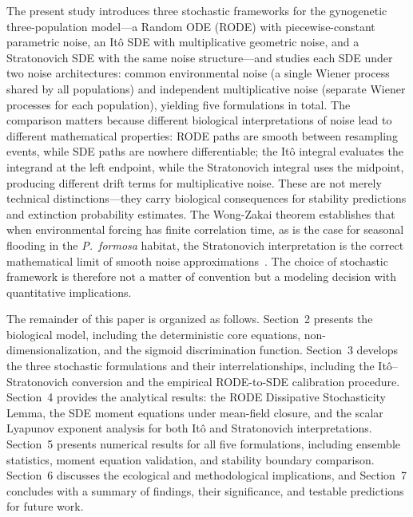 \documentclass[12pt]{article}
\begin{document}
The present study introduces three stochastic frameworks for the gynogenetic three-population model---a Random ODE (RODE) with piecewise-constant parametric noise, an It\^{o} SDE with multiplicative geometric noise, and a Stratonovich SDE with the same noise structure---and studies each SDE under two noise architectures: common environmental noise (a single Wiener process shared by all populations) and independent multiplicative noise (separate Wiener processes for each population), yielding five formulations in total.  The comparison matters because different biological interpretations of noise lead to different mathematical properties: RODE paths are smooth between resampling events, while SDE paths are nowhere differentiable; the It\^{o} integral evaluates the integrand at the left endpoint, while the Stratonovich integral uses the midpoint, producing different drift terms for multiplicative noise.  These are not merely technical distinctions---they carry biological consequences for stability predictions and extinction probability estimates.  The Wong-Zakai theorem establishes that when environmental forcing has finite correlation time, as is the case for seasonal flooding in the \textit{P.~formosa} habitat, the Stratonovich interpretation is the correct mathematical limit of smooth noise approximations~\citep{Oksendal2003}.  The choice of stochastic framework is therefore not a matter of convention but a modeling decision with quantitative implications.

The remainder of this paper is organized as follows.  Section~2 presents the biological model, including the deterministic core equations, non-dimensionalization, and the sigmoid discrimination function.  Section~3 develops the three stochastic formulations and their interrelationships, including the It\^{o}--Stratonovich conversion and the empirical RODE-to-SDE calibration procedure.  Section~4 provides the analytical results: the RODE Dissipative Stochasticity Lemma, the SDE moment equations under mean-field closure, and the scalar Lyapunov exponent analysis for both It\^{o} and Stratonovich interpretations.  Section~5 presents numerical results for all five formulations, including ensemble statistics, moment equation validation, and stability boundary comparison.  Section~6 discusses the ecological and methodological implications, and Section~7 concludes with a summary of findings, their significance, and testable predictions for future work.
\end{document}
